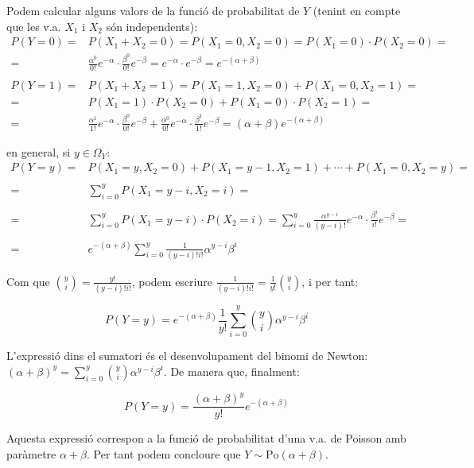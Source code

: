 \documentclass{article}
\begin{document}
\noindent
Podem calcular alguns valors de la funci\'o de probabilitat de $Y$ (tenint en compte que les
v.a. $X_1$ i $X_2$ s\'on independents):
\[
\begin{array}{rl}
P(Y=0)=&P(X_1+X_2=0)=P(X_1=0, X_2=0)=P(X_1=0)\cdot P(X_2=0)= \\
      =&\frac{\alpha^{0}}{0!} e^{-\alpha} \cdot \frac{\beta^{0}}{0!} e^{-\beta} = e^{-\alpha} \cdot e^{-\beta}=e^{-(\alpha+\beta)} \\ \\
P(Y=1)=&P(X_1+X_2=1)=P(X_1=1, X_2=0)+P(X_1=0, X_2=1)= \\
      =&P(X_1=1)\cdot P(X_2=0)+P(X_1=0)\cdot P(X_2=1)=\\
      =&\frac{\alpha^{1}}{1!} e^{-\alpha} \cdot \frac{\beta^{0}}{0!} e^{-\beta} + 
\frac{\alpha^{0}}{0!} e^{-\alpha} \cdot \frac{\beta^{1}}{1!} e^{-\beta}= (\alpha+\beta) e^{-(\alpha+\beta)} 
\end{array}
\]

\noindent
en general, si $y \in \Omega_Y$:
\[
\begin{array}{rl}
P(Y=y)=&P(X_1=y, X_2=0)+ P(X_1=y-1, X_2=1)+ \cdots + P(X_1=0, X_2=y)=\\ \\
      =& \sum_{i=0}^{y} P(X_1=y-i, X_2=i) = \\ \\
      =& \sum_{i=0}^{y} P(X_1=y-i) \cdot P(X_2=i) = 
      \sum_{i=0}^{y} \frac{\alpha^{y-i}}{(y-i)!} e^{-\alpha} \cdot \frac{\beta^{i}}{i!} e^{-\beta} = \\ \\
      =& e^{-(\alpha+\beta)} \sum_{i=0}^{y} \frac{1}{(y-i)! i!} \alpha^{y-i} \beta^{i}
\end{array}
\]

\noindent
Com que $\binom{y}{i}=\frac{y!}{(y-i)! i!}$, podem escriure $\frac{1}{(y-i)! i!} = \frac{1}{y!} \binom{y}{i}$,
i per tant:

\[
P(Y=y)= e^{-(\alpha+\beta)} \frac{1}{y!} \sum_{i=0}^{y} \binom{y}{i} \alpha^{y-i} \beta^{i}
\]

\noindent
L'expressi\'o dins el sumatori \'es el desenvolupament del binomi de Newton: 
$(\alpha + \beta)^y = \sum_{i=0}^{y} \binom{y}{i} \alpha^{y-i} \beta^{i}$. De manera que, finalment:

\[
P(Y=y)= \frac{(\alpha + \beta)^y}{y!} e^{-(\alpha+\beta)}
\]

\noindent
Aquesta expressi\'o correspon a la funci\'o de probabilitat d'una v.a. de Poisson amb par\`ametre
$\alpha+\beta$. Per tant podem concloure que $Y \sim \mathrm{Po}(\alpha+\beta)$.
\end{document}
